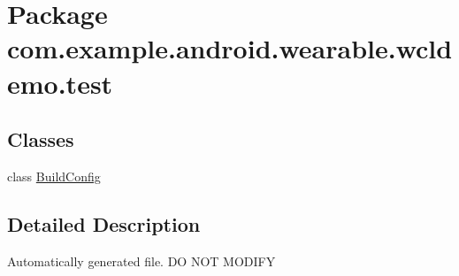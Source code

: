 \hypertarget{namespacecom_1_1example_1_1android_1_1wearable_1_1wcldemo_1_1test}{}\section{Package com.\+example.\+android.\+wearable.\+wcldemo.\+test}
\label{namespacecom_1_1example_1_1android_1_1wearable_1_1wcldemo_1_1test}
\subsection*{Classes}
\begin{DoxyCompactItemize}
\item 
class \hyperlink{classcom_1_1example_1_1android_1_1wearable_1_1wcldemo_1_1test_1_1BuildConfig}{Build\+Config}
\end{DoxyCompactItemize}


\subsection{Detailed Description}
Automatically generated file. DO N\+OT M\+O\+D\+I\+FY 
